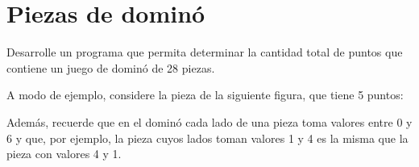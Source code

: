 \section{Piezas de dominó}

Desarrolle un programa que permita determinar la cantidad total de
puntos que contiene un juego de dominó de 28 piezas.

A modo de ejemplo, considere la pieza de la siguiente figura,
que tiene 5 puntos:



Además, recuerde que en el dominó cada lado de una pieza toma valores
entre 0 y 6 y que, por ejemplo, la pieza cuyos lados toman valores 1 y 4
es la misma que la pieza con valores 4 y 1.
